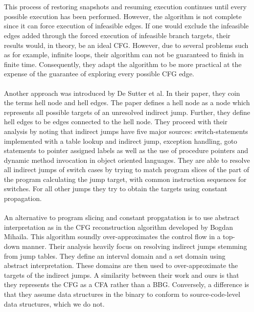 \documentclass{kththesis}
\begin{document}
\\ \\
This process of restoring snapshots and resuming execution continues until every possible execution has been performed. However, the algorithm is not complete since it can force execution of infeasible edges. If one would exclude the infeasible edges added through the forced execution of infeasible branch targets, their results would, in theory, be an ideal CFG. However, due to several problems such as for example, infinite loops, their algorithm can not be guaranteed to finish in finite time. Consequently, they adapt the algorithm to be more practical at the expense of the guarantee of exploring every possible CFG edge. 
\\ \\
Another approach was introduced by De Sutter et al\cite{staticOfInd}. In their paper, they coin the terms hell node and hell edges. The paper defines a hell node as a node which represents all possible targets of an unresolved indirect jump. Further, they define hell edges to be edges connected to the hell node. They proceed with their analysis by noting that indirect jumps have five major sources: switch-statements implemented with a table lookup and indirect jump, exception handling, goto statements to pointer assigned labels as well as the use of procedure pointers and dynamic method invocation in object oriented languages. They are able to resolve all indirect jumps of switch cases by trying to match program slices of the part of the program calculating the jump target, with common instruction sequences for switches. For all other jumps they try to obtain the targets using constant propagation.
\\ \\
An alternative to program slicing and constant propgatation is to use abstract interpretation as in the CFG reconstruction algorithm developed by Bogdan Mihaila\parencite{CFGFromPowerPC}. This algorithm soundly over-approximates the control flow in a top-down manner. Their analysis heavily focus on resolving indirect jumps stemming from jump tables. They define an interval domain and a set domain using abstract interpretation. These domains are then used to over-approximate the targets of the indirect jumps. A similarity between their work and ours is that they represents the CFG as a CFA rather than a BBG. Conversely, a difference is that they assume data structures in the binary to conform to source-code-level data structures, which we do not. 
\\ \\ 
\end{document}

